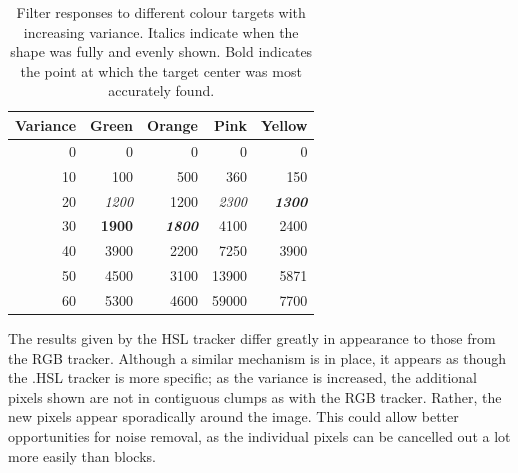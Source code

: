 \begin{table}
\centering
  \begin{tabular}{| r | r | r | r | r |}
    \hline
    Variance & Green & Orange & Pink & Yellow \\ \hline
    0 & 0 & 0 & 0 & 0 \\ \hline
    10 & 100 & 500 & 360 & 150 \\ \hline
    20 & \textit{1200} & 1200 & \textit{2300} & \textit{\textbf{1300}} \\ \hline
    30 & \textbf{1900} & \textit{\textbf{1800}} & 4100 & 2400 \\ \hline
    40 & 3900 & 2200 & 7250 & 3900 \\ \hline
    50 & 4500 & 3100 & 13900 & 5871 \\ \hline
    60 & 5300 & 4600 & 59000 & 7700 \\ \hline
  \end{tabular}
    \caption{Filter responses to different colour targets with increasing variance. Italics indicate when the shape was fully and evenly shown. Bold indicates the point at which the target center was most accurately found.}
\end{table}

The results given by the HSL tracker differ greatly in appearance to those from the RGB tracker. Although a similar mechanism is in place, it appears as though the .HSL tracker is more specific; as the variance is increased, the additional pixels shown are not in contiguous clumps as with the RGB tracker. Rather, the new pixels appear sporadically around the image. This could allow better opportunities for noise removal, as the individual pixels can be cancelled out a lot more easily than blocks.\\

